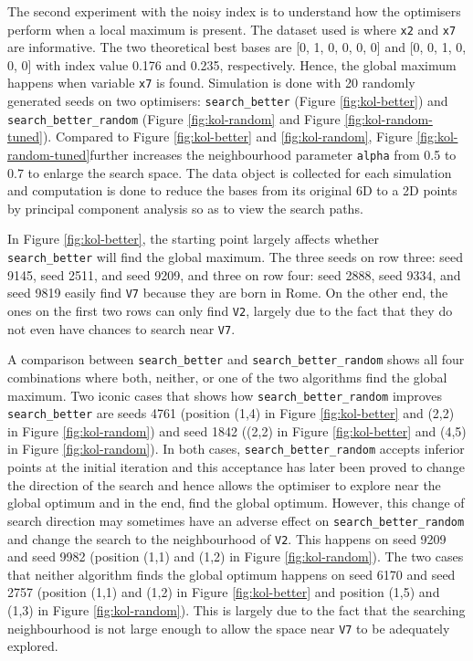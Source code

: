 The second experiment with the noisy index is to understand how the
optimisers perform when a local maximum is present. The dataset used is
 where \texttt{x2} and \texttt{x7} are informative. The two
theoretical best bases are {[}0, 1, 0, 0, 0, 0{]} and {[}0, 0, 1, 0, 0,
0{]} with index value 0.176 and 0.235, respectively. Hence, the global
maximum happens when variable \texttt{x7} is found. Simulation is done
with 20 randomly generated seeds on two optimisers:
\texttt{search\_better} (Figure \ref{fig:kol-better}) and
\texttt{search\_better\_random} (Figure \ref{fig:kol-random} and Figure
\ref{fig:kol-random-tuned}). Compared to Figure \ref{fig:kol-better} and
\ref{fig:kol-random}, Figure \ref{fig:kol-random-tuned}further increases
the neighbourhood parameter \texttt{alpha} from 0.5 to 0.7 to enlarge
the search space. The data object is collected for each simulation and
computation is done to reduce the bases from its original 6D to a 2D
points by principal component analysis so as to view the search paths.

In Figure \ref{fig:kol-better}, the starting point largely affects
whether \texttt{search\_better} will find the global maximum. The three
seeds on row three: seed 9145, seed 2511, and seed 9209, and three on
row four: seed 2888, seed 9334, and seed 9819 easily find \texttt{V7}
because they are born in Rome. On the other end, the ones on the first
two rows can only find \texttt{V2}, largely due to the fact that they do
not even have chances to search near \texttt{V7}.

A comparison between \texttt{search\_better} and
\texttt{search\_better\_random} shows all four combinations where both,
neither, or one of the two algorithms find the global maximum. Two
iconic cases that shows how \texttt{search\_better\_random} improves
\texttt{search\_better} are seeds 4761 (position (1,4) in Figure
\ref{fig:kol-better} and (2,2) in Figure \ref{fig:kol-random}) and seed
1842 ((2,2) in Figure \ref{fig:kol-better} and (4,5) in Figure
\ref{fig:kol-random}). In both cases, \texttt{search\_better\_random}
accepts inferior points at the initial iteration and this acceptance has
later been proved to change the direction of the search and hence allows
the optimiser to explore near the global optimum and in the end, find
the global optimum. However, this change of search direction may
sometimes have an adverse effect on \texttt{search\_better\_random} and
change the search to the neighbourhood of \texttt{V2}. This happens on
seed 9209 and seed 9982 (position (1,1) and (1,2) in Figure
\ref{fig:kol-random}). The two cases that neither algorithm finds the
global optimum happens on seed 6170 and seed 2757 (position (1,1) and
(1,2) in Figure \ref{fig:kol-better} and position (1,5) and (1,3) in
Figure \ref{fig:kol-random}). This is largely due to the fact that the
searching neighbourhood is not large enough to allow the space near
\texttt{V7} to be adequately explored.

